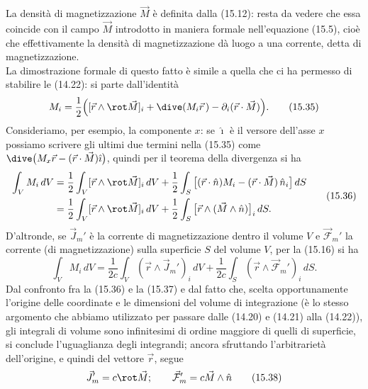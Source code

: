 La densit\`a di magnetizzazione $\vec M$ \`e definita dalla (15.12): resta da
vedere che essa coincide con il campo $\vec M$ introdotto in maniera formale
nell'equazione (15.5), cio\`e che effettivamente la densit\`a di magnetizzazione
d\`a luogo a una corrente, detta di magnetizzazione.\\
La dimostrazione formale di questo fatto \`e simile a quella che ci ha permesso
di stabilire le (14.22): si parte dall'identit\`a
\begin{equation}
  M_i=\frac12\Big([\vec r\wedge\rot\vec M]_i
  +\dive(M_i\vec r\,)-\partial_i(\vec r\cdot\vec M)\Big).
  \tag{15.35}
\end{equation}
Consideriamo, per esempio, la componente $x$: se $\hat\imath$ \`e il versore
dell'asse $x$ possiamo scrivere gli ultimi due termini nella (15.35) come
$\dive\big(M_x\vec r-(\vec r\cdot\vec M)\hat\imath\big)$, quindi per il teorema
della divergenza si ha
\begin{equation}
  \begin{split}
    \int_VM_i\,dV&=\frac12\int_V[\vec r\wedge\rot\vec M]_i\,dV
    +\frac12\int_S\big[(\vec r\cdot\hat n)M_i
    -(\vec r\cdot\vec M)\,\hat n_i\big]\,dS\\
    &=\frac12\int_V[\vec r\wedge\rot\vec M]_i\,dV
    +\frac12\int_S\big[\vec r\wedge(\vec M\wedge\hat n)\big]_i\,dS.
  \end{split}
  \tag{15.36}
\end{equation}
D'altronde, se $\vec J_m'$ \`e la corrente di magnetizzazione dentro il volume
$V$ e $\vec{\mathcal F}_m'$ la corrente (di magnetizzazione) sulla superficie
$S$ del volume $V$, per la (15.16) si ha
\begin{equation}
  \int_VM_i\,dV=\frac{1}{2c}\int_V(\vec r\wedge\vec J_m')_i\,dV
  +\frac{1}{2c}\int_S(\vec r\wedge\vec{\mathcal F}_m')_i\,dS.
  \tag{15.37}
\end{equation}
Dal confronto fra la (15.36) e la (15.37) e dal fatto che, scelta opportunamente
l'origine delle coordinate e le dimensioni del volume di integrazione \big(\`e
lo stesso argomento che abbiamo utilizzato per passare dalle (14.20) e (14.21)
alla (14.22)\big), gli integrali di volume sono infinitesimi di ordine maggiore
di quelli di superficie, si conclude l'uguaglianza degli integrandi; ancora
sfruttando l'arbitrariet\`a dell'origine, e quindi del vettore $\vec r$, segue
\begin{equation}
  \vec J_m'=c\rot\vec M;\qquad\vec{\mathcal F}_m'=c\vec M\wedge\hat n
  \tag{15.38}
\end{equation}
